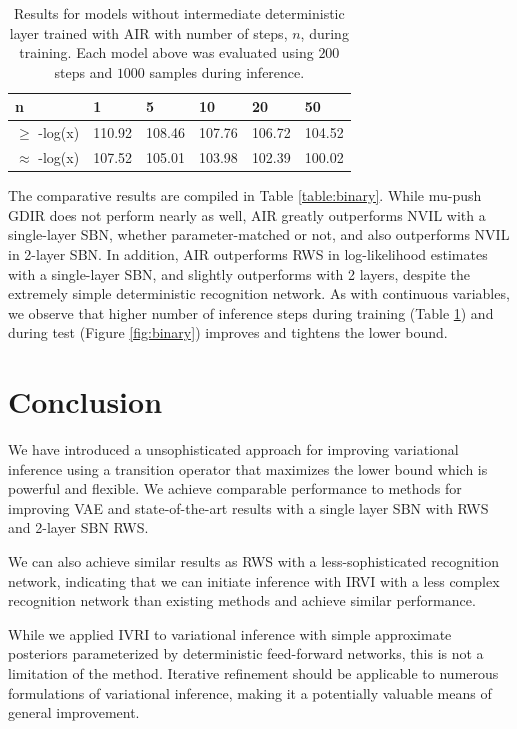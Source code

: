 \documentclass{article} %
\begin{document}
\begin{table}
\begin{tabular}{ | m{1.4cm} | m{1cm} | m{1cm} | m{1cm} | m{1cm} | m{1cm} |}
\hline
n & 1 & 5 & 10 & 20 & 50 \\
\hline
$\ge$ -log(x) & 110.92 & 108.46 & 107.76 & 106.72 & 104.52 \\
\hline
$\approx$ -log(x) & 107.52 & 105.01 & 103.98 & 102.39 & 100.02 \\
\hline
\end{tabular}
\caption{Results for models without intermediate deterministic layer trained with AIR with number of steps, $n$, during training. Each model above was evaluated using $200$ steps and $1000$ samples during inference.}
\label{table:binary_step}
\end{table}

The comparative results are compiled in Table \ref{table:binary}. While mu-push GDIR does not perform nearly as well, AIR greatly outperforms NVIL with a single-layer SBN, whether parameter-matched or not, and also outperforms NVIL in 2-layer SBN. In addition, AIR outperforms RWS in log-likelihood estimates with a single-layer SBN, and slightly outperforms with 2 layers, despite the extremely simple deterministic recognition network. As with continuous variables, we observe that higher number of inference steps during training (Table \ref{table:binary_step}) and during test (Figure \ref{fig:binary}) improves and tightens the lower bound.

\section{Conclusion}
We have introduced a unsophisticated approach for improving variational inference using a transition operator that maximizes the lower bound which is powerful and flexible. We achieve comparable performance to methods for improving VAE and state-of-the-art results with a single layer SBN with RWS and 2-layer SBN RWS.

We can also achieve similar results as RWS with a less-sophisticated recognition network, indicating that we can initiate inference with IRVI with a less complex recognition network than existing methods and achieve similar performance.

While we applied IVRI to variational inference with simple approximate posteriors parameterized by deterministic feed-forward networks, this is not a limitation of the method. Iterative refinement should be applicable to numerous formulations of variational inference, making it a potentially valuable means of general improvement.
\end{document}
